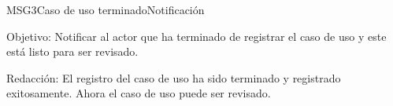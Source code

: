 \begin{mensaje}{MSG3}{Caso de uso terminado}{Notificación}
	\item [Objetivo:] Notificar al actor que ha terminado de registrar el caso de uso y este está listo para ser revisado.
	\item[Redacción:] El registro del caso de uso ha sido terminado y registrado exitosamente. Ahora el caso de uso puede ser revisado.
\end{mensaje}